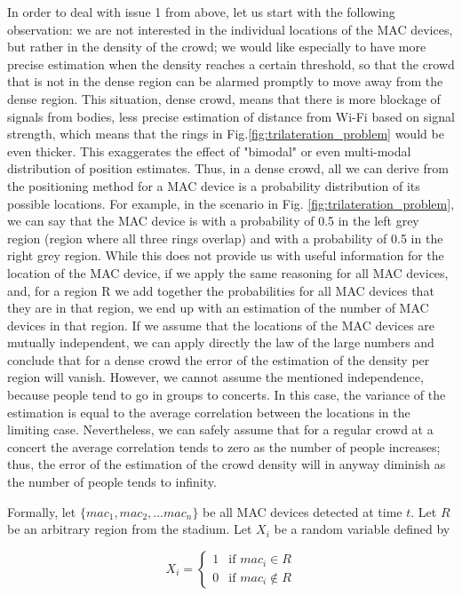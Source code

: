 \documentclass[10pt,a4paper]{article}
\begin{document}
In order to deal with issue 1 from above, let us start with the following observation: we are not interested in the individual locations of the MAC devices, but rather in the density of the crowd; we would like especially to have more precise estimation when the density reaches a certain threshold, so that the crowd that is not in the dense region can be alarmed promptly to move away from the dense region.
This situation, dense crowd, means that there is more blockage of signals from bodies, less precise estimation of distance from Wi-Fi based on signal strength, which means that the rings in Fig.\ref{fig:trilateration_problem} would be even thicker. This exaggerates the effect of "bimodal" or even multi-modal distribution of position estimates. Thus, in a dense crowd, all we can derive from the positioning method for a MAC device is a probability distribution of its possible locations. For example, in the scenario in Fig. \ref{fig:trilateration_problem}, we can say that the MAC device is with a probability of 0.5 in the left grey region (region where all three rings overlap) and with a probability of 0.5 in the right grey region. While this does not provide us with useful information for the location of the MAC device, if we apply the same reasoning for all MAC devices, and, for a region R we add together the probabilities for all MAC devices that they are in that region, we end up with an estimation of the number of MAC devices in that region. If we assume that the locations of the MAC devices are mutually independent, we can  apply directly the law of the large numbers and conclude that for a dense crowd the error of the estimation of the density per region will vanish. However, we cannot assume the mentioned independence, because people tend to go in groups to concerts. In this case, the variance of the estimation is equal to the average correlation between the locations in the limiting case. Nevertheless, we can safely assume that for a regular crowd at a concert the average correlation tends to zero as the number of people increases; thus, the error of the estimation of the crowd density will in anyway diminish as the number of people tends to infinity. 

Formally, 
let $\{mac_1, mac_2,...mac_n\}$ be all MAC devices detected at time $t$. Let $R$ be an arbitrary region from the stadium.  Let $X_i$ be a random variable defined by

$$X_i = 
\left\{
\begin{array}{ll}
1  & \mbox{if } mac_i \in R \\
0 & \mbox{if } mac_i \notin R
\end{array}
\right.  $$
\end{document}

